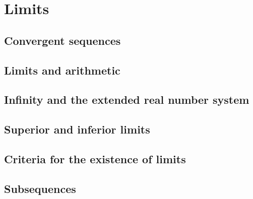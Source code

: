 \chapter{Limits}
\section{Convergent sequences}
\section{Limits and arithmetic}
\section{Infinity and the extended real number system}
\section{Superior and inferior limits}
\section{Criteria for the existence of limits}
\section{Subsequences}
